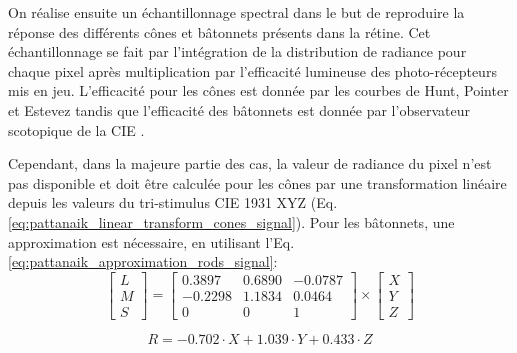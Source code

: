 	\par On réalise ensuite un échantillonnage spectral dans le but de reproduire la réponse des différents cônes et bâtonnets présents dans la rétine. Cet échantillonnage se fait par l'intégration de la distribution de radiance pour chaque pixel après multiplication par l'efficacité lumineuse des photo-récepteurs mis en jeu. L'efficacité pour les cônes est donnée par les courbes de Hunt, Pointer et Estevez \citep{fairchild_color_1998} tandis que l'efficacité des bâtonnets est donnée par l'observateur scotopique de la CIE \citep{wyszecki_color_2000}.
	
	\par Cependant, dans la majeure partie des cas, la valeur de radiance du pixel n'est pas disponible et doit être calculée pour les cônes par une transformation linéaire depuis les valeurs du tri-stimulus CIE 1931 XYZ (Eq. \ref{eq:pattanaik_linear_transform_cones_signal}). Pour les bâtonnets, une approximation est nécessaire, en utilisant l'Eq. \ref{eq:pattanaik_approximation_rods_signal}:
	\begin{equation}
		\left[ \begin{array}{c}L\\ M\\ S\end{array} \right] = \left[ \begin{array}{ccc}
		0.3897 & 0.6890 & -0.0787\\
		-0.2298 & 1.1834 & 0.0464\\
		0 & 0 & 1		
		\end{array} \right] \times \left[ \begin{array}{c}X\\ Y\\ Z\end{array} \right]
		\label{eq:pattanaik_linear_transform_cones_signal}
	\end{equation}
	
	\begin{equation}
		R = -0.702 \cdot X + 1.039 \cdot Y + 0.433 \cdot Z
		\label{eq:pattanaik_approximation_rods_signal}
	\end{equation}
	
